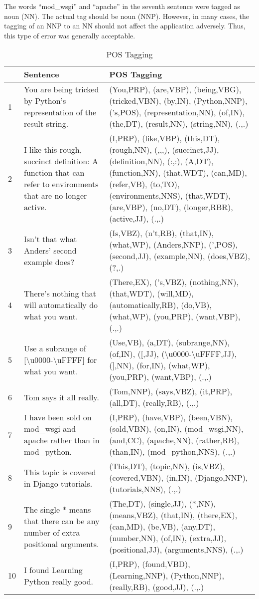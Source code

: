 The words ``mod\_wsgi'' and ``apache'' in the seventh sentence were tagged as
noun (NN). The actual tag should be noun (NNP). However, in many cases, the
tagging of an NNP to an NN should not affect the application adversely. Thus,
this type of error was generally acceptable.

\begin{table}[htp]
\caption{POS Tagging}\label{pos}
\begin{tabu}{X[0.1,l]X[1,l]X[2,l]}
    & \textbf{Sentence} & \textbf{POS Tagging} \\
     & You are being tricked by Python's representation of the result
    string. &
    (You,PRP), (are,VBP), (being,VBG), (tricked,VBN), (by,IN), (Python,NNP),
    ('s,POS), (representation,NN), (of,IN), (the,DT), (result,NN), 
    (string,NN), (.,.) \\
    2 & I like this rough, succinct definition: A function that can refer to 
    environments that are no longer active. &
    (I,PRP), (like,VBP), (this,DT), (rough,NN), (,,,), (succinct,JJ),
    (definition,NN), (:,:), (A,DT), (function,NN), (that,WDT), (can,MD),
    (refer,VB), (to,TO), (environments,NNS), (that,WDT), (are,VBP), (no,DT),
    (longer,RBR), (active,JJ), (.,.) \\
    3 & Isn't that what Anders' second example does? &
    (Is,VBZ), (n't,RB), (that,IN), (what,WP), (Anders,NNP), (',POS),
    (second,JJ), (example,NN), (does,VBZ), (?,.) \\
    4 & There's nothing that will automatically do what you want. & 
    (There,EX), ('s,VBZ), (nothing,NN), (that,WDT), (will,MD),
    (automatically,RB), (do,VB), (what,WP), (you,PRP), (want,VBP), (.,.) \\
    5 & Use a subrange of [\textbackslash{}u0000-\textbackslash{}uFFFF] for
    what you want. & 
    (Use,VB), (a,DT), (subrange,NN), (of,IN), ([,JJ),
    (\textbackslash{}u0000-\textbackslash{}uFFFF,JJ), (],NN),
    (for,IN), (what,WP), (you,PRP), (want,VBP), (.,.) \\
    6 & Tom says it all really. &
    (Tom,NNP), (says,VBZ), (it,PRP), (all,DT), (really,RB), (.,.) \\
    7 & I have been sold on mod\_wsgi and apache rather than in mod\_python. &
    (I,PRP), (have,VBP), (been,VBN), (sold,VBN), (on,IN), (mod\_wsgi,NN),
    (and,CC), (apache,NN), (rather,RB), (than,IN), (mod\_python,NNS), (.,.) \\
    8 & This topic is covered in Django tutorials. &
    (This,DT), (topic,NN), (is,VBZ), (covered,VBN), (in,IN), (Django,NNP),
    (tutorials,NNS), (.,.) \\
    9 & The single * means that there can be any number of extra positional
    arguments. &
    (The,DT), (single,JJ), (*,NN), (means,VBZ), (that,IN), (there,EX), (can,MD),
    (be,VB), (any,DT), (number,NN), (of,IN), (extra,JJ), (positional,JJ),
    (arguments,NNS), (.,.) \\
    10 & I found Learning Python really good. &
    (I,PRP), (found,VBD), (Learning,NNP), (Python,NNP), (really,RB), (good,JJ),
    (.,.) \\    
\end{tabu} 
\end{table}

